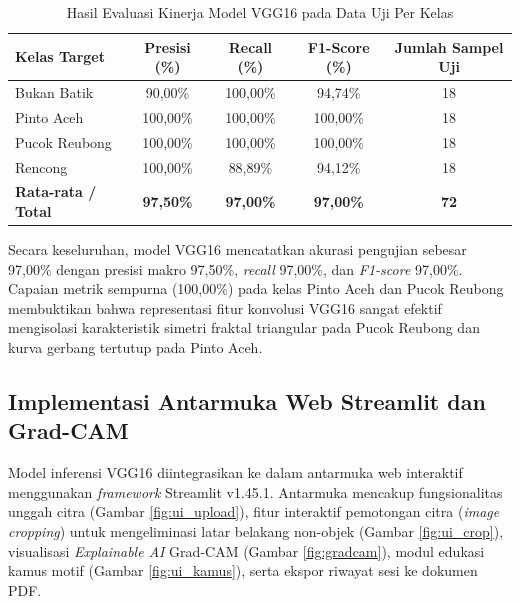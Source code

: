 \documentclass[10pt,a4paper]{article}
\begin{document}
\begin{table}[htbp]
  \centering
  \caption{Hasil Evaluasi Kinerja Model VGG16 pada Data Uji Per Kelas}
  \label{tab:metrik_evaluasi}
  \fontsize{8.5pt}{11pt}\selectfont
  \begin{tabular}{lcccc}
    \toprule
    \textbf{Kelas Target} & \textbf{Presisi (\%)} & \textbf{Recall (\%)} & \textbf{F1-Score (\%)} & \textbf{Jumlah Sampel Uji} \\
    \midrule
    Bukan Batik   & 90,00\%  & 100,00\% & 94,74\% & 18 \\
    Pinto Aceh    & 100,00\% & 100,00\% & 100,00\% & 18 \\
    Pucok Reubong & 100,00\% & 100,00\% & 100,00\% & 18 \\
    Rencong       & 100,00\% & 88,89\%  & 94,12\% & 18 \\
    \midrule
    \textbf{Rata-rata / Total} & \textbf{97,50\%} & \textbf{97,00\%} & \textbf{97,00\%} & \textbf{72} \\
    \bottomrule
  \end{tabular}
\end{table}

Secara keseluruhan, model VGG16 mencatatkan akurasi pengujian sebesar 97,00\% dengan presisi makro 97,50\%, \textit{recall} 97,00\%, dan \textit{F1-score} 97,00\%. Capaian metrik sempurna (100,00\%) pada kelas Pinto Aceh dan Pucok Reubong membuktikan bahwa representasi fitur konvolusi VGG16 sangat efektif mengisolasi karakteristik simetri fraktal triangular pada Pucok Reubong dan kurva gerbang tertutup pada Pinto Aceh.

\subsection{Implementasi Antarmuka Web Streamlit dan Grad-CAM}
Model inferensi VGG16 diintegrasikan ke dalam antarmuka web interaktif menggunakan \textit{framework} Streamlit v1.45.1. Antarmuka mencakup fungsionalitas unggah citra (Gambar \ref{fig:ui_upload}), fitur interaktif pemotongan citra (\textit{image cropping}) untuk mengeliminasi latar belakang non-objek (Gambar \ref{fig:ui_crop}), visualisasi \textit{Explainable AI} Grad-CAM (Gambar \ref{fig:gradcam}), modul edukasi kamus motif (Gambar \ref{fig:ui_kamus}), serta ekspor riwayat sesi ke dokumen PDF.
\end{document}
